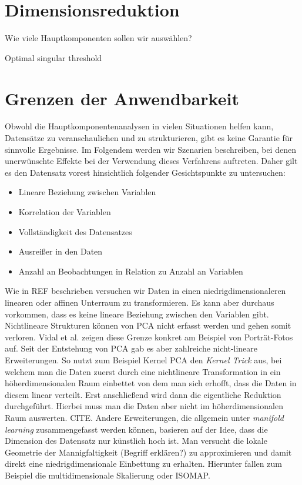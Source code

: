 \section{Dimensionsreduktion}
Wie viele Hauptkomponenten sollen wir auswählen?

Optimal singular threshold \cite{gavish}

\section{Grenzen der Anwendbarkeit}

Obwohl die Hauptkomponentenanalysen in vielen Situationen helfen kann, Datensätze zu veranschaulichen und zu strukturieren, gibt es keine Garantie für sinnvolle Ergebnisse. Im Folgendem werden wir Szenarien beschreiben, bei denen unerwünschte Effekte bei der Verwendung dieses Verfahrens auftreten. Daher gilt es den Datensatz vorest hinsichtlich folgender Gesichtspunkte zu untersuchen: 

\begin{itemize}
\item Lineare Beziehung zwischen Variablen
\item Korrelation der Variablen
\item Vollständigkeit des Datensatzes
\item Ausreißer in den Daten
\item Anzahl an Beobachtungen in Relation zu Anzahl an Variablen
\end{itemize}

Wie in REF beschrieben versuchen wir Daten in einen niedrigdimensionaleren linearen oder affinen Unterraum zu transformieren. Es kann aber durchaus vorkommen, dass es keine lineare Beziehung zwischen den Variablen gibt. Nichtlineare Strukturen können von PCA nicht erfasst werden und gehen somit verloren. \cite{vidal} Vidal et al. zeigen diese Grenze konkret am Beispiel von Porträt-Fotos auf. Seit der Entstehung von PCA gab es aber zahlreiche nicht-lineare Erweiterungen. So nutzt zum Beispiel Kernel PCA den \textit{Kernel Trick} aus, bei welchem man die Daten zuerst durch eine nichtlineare Transformation in ein höherdimensionalen Raum einbettet von dem man sich erhofft, dass die Daten in diesem linear verteilt. Erst anschließend wird dann die eigentliche Reduktion durchgeführt. Hierbei muss man die Daten aber nicht im höherdimensionalen Raum auswerten. CITE. Andere Erweiterungen, die allgemein unter \textit{manifold learning} zusammengefasst werden können, basieren auf der Idee, dass die Dimension des Datensatz nur künstlich hoch ist. Man versucht die lokale Geometrie der Mannigfaltigkeit (Begriff erklären?) zu approximieren und damit direkt eine niedrigdimensionale Einbettung zu erhalten. Hierunter fallen zum Beispiel die multidimensionale Skalierung oder ISOMAP.

